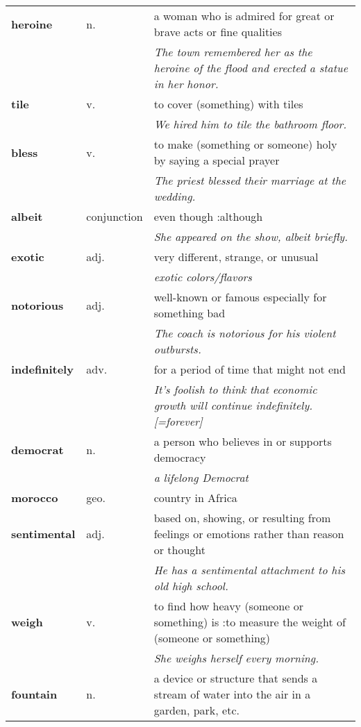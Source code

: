 \documentclass[a4paper]{article}
\begin{document}
\begin{longtable}{llp{12cm}}
\textbf{heroine} & n. &  a woman who is admired for great or brave acts or fine qualities \\
 & & \textit{The town remembered her as the heroine of the flood and erected a statue in her honor.}\\[0.08cm]
\textbf{tile} & v. &  to cover (something) with tiles \\
 & & \textit{We hired him to tile the bathroom floor.}\\[0.08cm]
\textbf{bless} & v. &  to make (something or someone) holy by saying a special prayer \\
 & & \textit{The priest blessed their marriage at the wedding.}\\[0.08cm]
\textbf{albeit} & conjunction &  even though :although \\
 & & \textit{She appeared on the show, albeit briefly.}\\[0.08cm]
\textbf{exotic} & adj. &  very different, strange, or unusual \\
 & & \textit{exotic colors/flavors}\\[0.08cm]
\textbf{notorious} & adj. &  well-known or famous especially for something bad \\
 & & \textit{The coach is notorious for his violent outbursts.}\\[0.08cm]
\textbf{indefinitely} & adv. &  for a period of time that might not end \\
 & & \textit{It's foolish to think that economic growth will continue indefinitely. [=forever]}\\[0.08cm]
\textbf{democrat} & n. &  a person who believes in or supports democracy\\
 & & \textit{a lifelong Democrat}\\[0.08cm]
\textbf{morocco} & geo. &  country in Africa\\[0.08cm]
\textbf{sentimental} & adj. &  based on, showing, or resulting from feelings or emotions rather than reason or thought \\
 & & \textit{He has a sentimental attachment to his old high school.}\\[0.08cm]
\textbf{weigh} & v. &  to find how heavy (someone or something) is :to measure the weight of (someone or something) \\
 & & \textit{She weighs herself every morning.}\\[0.08cm]
\textbf{fountain} & n. &  a device or structure that sends a stream of water into the air in a garden, park, etc. \\

\end{longtable}
\end{document}
